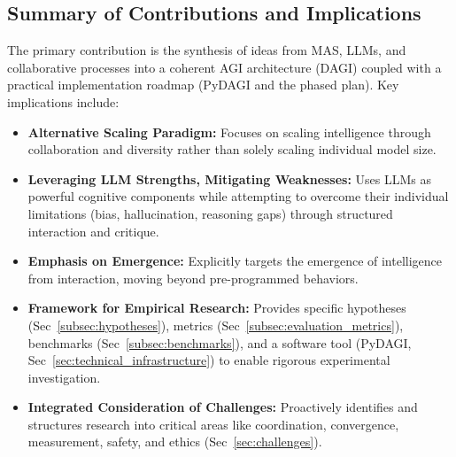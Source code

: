 \documentclass[12pt]{amsart}
\begin{document}
\subsection{Summary of Contributions and Implications}
The primary contribution is the synthesis of ideas from MAS, LLMs, and collaborative processes into a coherent AGI architecture (DAGI) coupled with a practical implementation roadmap (PyDAGI and the phased plan). Key implications include:
\begin{itemize}[leftmargin=*]
    \item \textbf{Alternative Scaling Paradigm:} Focuses on scaling intelligence through collaboration and diversity rather than solely scaling individual model size.
    \item \textbf{Leveraging LLM Strengths, Mitigating Weaknesses:} Uses LLMs as powerful cognitive components while attempting to overcome their individual limitations (bias, hallucination, reasoning gaps) through structured interaction and critique.
    \item \textbf{Emphasis on Emergence:} Explicitly targets the emergence of intelligence from interaction, moving beyond pre-programmed behaviors.
    \item \textbf{Framework for Empirical Research:} Provides specific hypotheses (Sec~\ref{subsec:hypotheses}), metrics (Sec~\ref{subsec:evaluation_metrics}), benchmarks (Sec~\ref{subsec:benchmarks}), and a software tool (PyDAGI, Sec~\ref{sec:technical_infrastructure}) to enable rigorous experimental investigation.
    \item \textbf{Integrated Consideration of Challenges:} Proactively identifies and structures research into critical areas like coordination, convergence, measurement, safety, and ethics (Sec~\ref{sec:challenges}).
\end{itemize}
\end{document}
